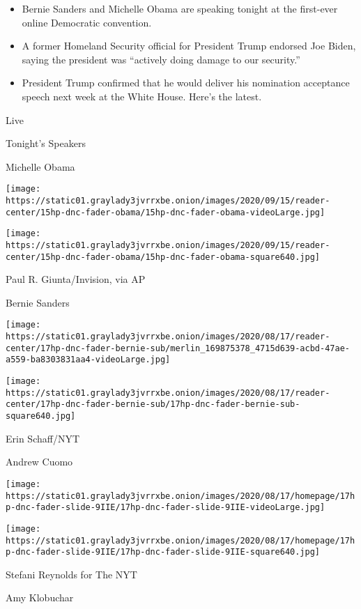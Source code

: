 \href{https://www.nytimes3xbfgragh.onion/live/2020/08/17/us/dnc-convention}{}

\begin{itemize}
\tightlist
\item
  Bernie Sanders and Michelle Obama are speaking tonight at the
  first-ever online Democratic convention.
\item
  A former Homeland Security official for President Trump endorsed Joe
  Biden, saying the president was ``actively doing damage to our
  security.''
\item
  President Trump confirmed that he would deliver his nomination
  acceptance speech next week at the White House. Here's the latest.
\end{itemize}

Live

\href{https://www.nytimes3xbfgragh.onion/article/dnc-schedule.html}{}

Tonight's Speakers

Michelle Obama

\texttt{[image: https://static01.graylady3jvrrxbe.onion/images/2020/09/15/reader-center/15hp-dnc-fader-obama/15hp-dnc-fader-obama-videoLarge.jpg]}

\texttt{[image: https://static01.graylady3jvrrxbe.onion/images/2020/09/15/reader-center/15hp-dnc-fader-obama/15hp-dnc-fader-obama-square640.jpg]}

 Paul R. Giunta/Invision, via AP

Bernie Sanders

\texttt{[image: https://static01.graylady3jvrrxbe.onion/images/2020/08/17/reader-center/17hp-dnc-fader-bernie-sub/merlin\_169875378\_4715d639-acbd-47ae-a559-ba8303831aa4-videoLarge.jpg]}

\texttt{[image: https://static01.graylady3jvrrxbe.onion/images/2020/08/17/reader-center/17hp-dnc-fader-bernie-sub/17hp-dnc-fader-bernie-sub-square640.jpg]}

 Erin Schaff/NYT

Andrew Cuomo

\texttt{[image: https://static01.graylady3jvrrxbe.onion/images/2020/08/17/homepage/17hp-dnc-fader-slide-9IIE/17hp-dnc-fader-slide-9IIE-videoLarge.jpg]}

\texttt{[image: https://static01.graylady3jvrrxbe.onion/images/2020/08/17/homepage/17hp-dnc-fader-slide-9IIE/17hp-dnc-fader-slide-9IIE-square640.jpg]}

 Stefani Reynolds for The NYT

Amy Klobuchar

